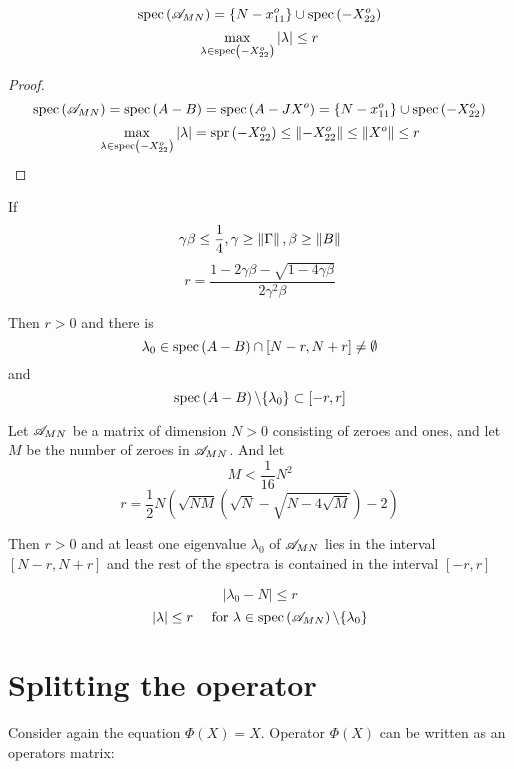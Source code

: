 \documentclass{article}
\begin{document}
\begin{propose}
    \[ \mathrm{spec}\left({\mathscr{A}_{{M}{N}}}\right)  = \left\{N - x_{11}^o\right\} \cup \mathrm{spec}\left({-X_{22}^o}\right) \]
    \[ \max_{\lambda\in\mathrm{spec}\left({-X_{22}^o}\right)} \left|\lambda\right| \leq r \]
\end{propose}
\begin{proof}
    \[ \mathrm{spec}\left({\mathscr{A}_{{M}{N}}}\right) = \mathrm{spec}\left({A-B}\right) = \mathrm{spec}\left({A-JX^o}\right) = \{N - x_{11}^o\} \cup \mathrm{spec}\left({-X_{22}^o}\right) \]
    \[ \max_{\lambda\in\mathrm{spec}\left({-X_{22}^o}\right)} \left|\lambda\right| = \mathrm{spr}\left({-X_{22}^o}\right) \leq \left\|{-X_{22}^o}\right\| \leq \left\|{X^o}\right\| \leq r \]
\end{proof}

\begin{lemma}
    If
    \[\gamma\beta\leq\frac14, \gamma\geq\left\|{\Gamma}\right\|, \beta\geq\left\|{B}\right\|\]
    \[r = \frac{1 - 2\gamma\beta - \sqrt{1-4\gamma\beta}}{2 \gamma^2 \beta}\]

    Then $r>0$ and there is
	\[ \lambda_0\in\mathrm{spec}\left({A-B}\right) \cap \left[N-r,N+r\right] \neq\emptyset \]
	and
	\[ \mathrm{spec}\left({A-B}\right)\backslash\{\lambda_0\} \subset \left[-r,r\right] \]
\end{lemma}
\begin{thm}
    Let \( \mathscr{A}_{{M}{N}} \) be a matrix of dimension \( N>0 \) consisting of zeroes and ones,
    and let \( M \) be the number of zeroes in \( \mathscr{A}_{{M}{N}} \).
    And let
    \[ M < \frac{1}{16} N^2 \]
    \[ r = \frac12 N
        \left(
        \sqrt{NM}(\sqrt{N} - \sqrt{N-4\sqrt{M}}) - 2
        \right) \]

    Then $r>0$ and at least one eigenvalue \( \lambda_0 \) of \( \mathscr{A}_{{M}{N}} \) lies in the interval \(\left[N-r,N+r\right]\)
	and the rest of the spectra is contained in the interval \( \left[-r,r\right] \)

    \[ \left|\lambda_0 - N\right| \leq r \]
    \[ \left|\lambda\right| \leq r \quad \text{ for } \lambda\in\mathrm{spec}\left({\mathscr{A}_{{M}{N}}}\right)\backslash\{\lambda_0\} \]
\end{thm}

\section{Splitting the operator}
Consider again the equation \( \Phi(X) = X \).
Operator \( \Phi(X) \) can be written as an operators matrix:
\end{document}
